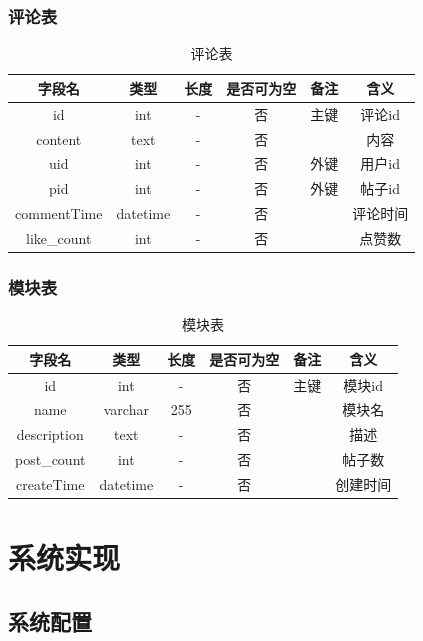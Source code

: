 \documentclass[UTF8]{ctexart}
\begin{document}
\subsubsection{评论表}

\begin{table}[H]
  \centering
  \begin{tabular}{|c|c|c|c|c|c|}
  \hline
      字段名 & 类型 & 长度 & 是否可为空&备注&含义\\ \hline
      id & int & - & 否 & 主键 & 评论id \\ \hline
      content & text & - & 否 &  & 内容 \\ \hline
      uid & int & - & 否 & 外键 & 用户id \\ \hline
      pid & int & - & 否 & 外键 & 帖子id \\ \hline
      commentTime & datetime &-  & 否 &  & 评论时间 \\ \hline
      like\_count & int &-  & 否 &  & 点赞数 \\ \hline
  \end{tabular}
  \caption{评论表}
\end{table}

\subsubsection{模块表}

\begin{table}[H]
  \centering
  \begin{tabular}{|c|c|c|c|c|c|}
  \hline
      字段名 & 类型 & 长度 & 是否可为空&备注&含义\\ \hline
      id & int & - & 否 & 主键 & 模块id \\ \hline
      name & varchar &255  & 否 &  & 模块名 \\ \hline
      description & text & - & 否 &  & 描述 \\ \hline
      post\_count & int & - & 否 &  & 帖子数 \\ \hline
      createTime & datetime & - & 否 &  & 创建时间 \\ \hline
  \end{tabular}
  \caption{模块表}
\end{table}



\newpage
\section{系统实现}
\subsection{系统配置}
\end{document}
